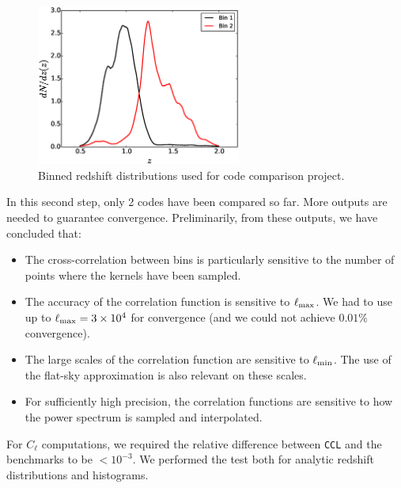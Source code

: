 \documentclass[\docopts]{\docclass}
\newcommand{\ccl}{{\tt CCL}\xspace}
\begin{document}
\begin{figure}
\centering
\includegraphics[width=0.6\textwidth]{zdist.eps}
\caption{Binned redshift distributions used for code comparison project.}
\label{fig:zhistos}
\end{figure}

In this second step, only 2 codes have been compared so far. More outputs are needed to guarantee convergence. Preliminarily, from these outputs, we have concluded that:
\begin{itemize}
\item The cross-correlation between bins is particularly sensitive to the number of points where the kernels have been sampled.
\item The accuracy of the correlation function is sensitive to $\ell_{\rm max}$. We had to use up to $\ell_{\rm max}=3\times10^4$ for convergence (and we could not achieve $0.01\%$ convergence).
\item The large scales of the correlation function are sensitive to $\ell_{\rm min}$. The use of the flat-sky approximation is also relevant on these scales.
\item For sufficiently high precision, the correlation functions are sensitive to how the power spectrum is sampled and interpolated.
\end{itemize}

For $C_\ell$ computations, we required the relative difference between \ccl and the benchmarks to be $<10^{-3}$. We performed the test both for analytic redshift distributions and histograms.
\end{document}

